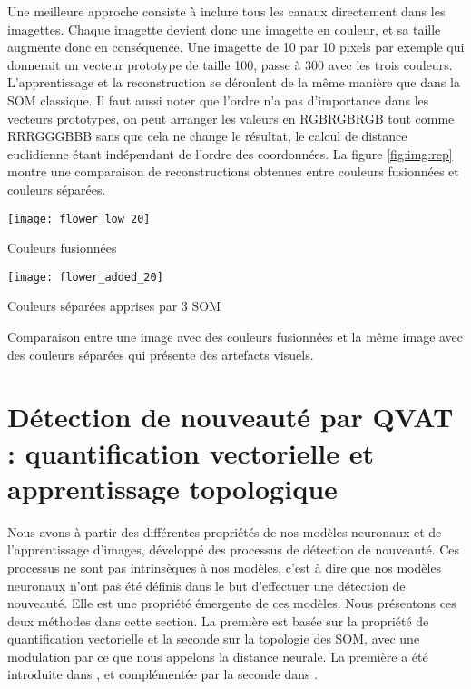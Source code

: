 	Une meilleure approche consiste à inclure tous les canaux directement dans les imagettes. Chaque imagette devient donc une imagette en couleur, et sa taille augmente donc en conséquence. Une imagette de 10 par 10 pixels par exemple qui donnerait un vecteur prototype de taille 100, passe à 300 avec les trois couleurs. L'apprentissage et la reconstruction se déroulent de la même manière que dans la SOM classique. Il faut aussi noter que l'ordre n'a pas d'importance dans les vecteurs prototypes, on peut arranger les valeurs en RGBRGBRGB tout comme RRRGGGBBB sans que cela ne change le résultat, le calcul de distance euclidienne étant indépendant de l'ordre des coordonnées. La figure \ref{fig:img:rep} montre une comparaison de reconstructions obtenues entre couleurs fusionnées et couleurs séparées.

	\begin{figureth}
		\begin{subfigureth}{0.48\textwidth}
			\texttt{[image: flower\_low\_20]}\caption{Couleurs fusionnées}	
		\end{subfigureth}
		\begin{subfigureth}{0.48\textwidth}
			\texttt{[image: flower\_added\_20]}\caption{Couleurs séparées apprises par 3 SOM}	
		\end{subfigureth}
		\caption[Représentation d'une image]{Comparaison entre une image avec des couleurs fusionnées et la même image avec des couleurs séparées qui présente des artefacts visuels.\footnotemark}\label{fig:img:rep}
	\end{figureth}


	\newpage
	\section{Détection de nouveauté par QVAT : quantification vectorielle et apprentissage topologique}

	Nous avons à partir des différentes propriétés de nos modèles neuronaux et de l'apprentissage d'images, développé des processus de détection de nouveauté. Ces processus ne sont pas intrinsèques à nos modèles, c'est à dire que nos modèles neuronaux n'ont pas été définis dans le but d'effectuer une détection de nouveauté. Elle est une propriété émergente de ces modèles. Nous présentons ces deux méthodes dans cette section. La première est basée sur la propriété de quantification vectorielle et la seconde sur la topologie des SOM, avec une modulation par ce que nous appelons la distance neurale. La première a été introduite dans \cite{bernard2019novelty}, et complémentée par la seconde dans \cite{bernard2020novelty}.

